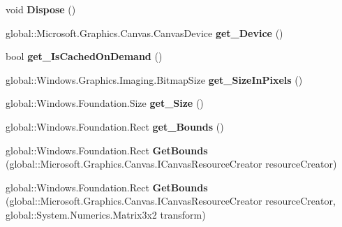 \begin{DoxyCompactItemize}
void {\bfseries Dispose} ()
\item 
\mbox{\label{class_microsoft_1_1_graphics_1_1_canvas_1_1_canvas_virtual_bitmap_add2a220c3a0d0912f49273fd03bc60ef}} 
global\+::\+Microsoft.\+Graphics.\+Canvas.\+Canvas\+Device {\bfseries get\+\_\+\+Device} ()
\item 
\mbox{\label{class_microsoft_1_1_graphics_1_1_canvas_1_1_canvas_virtual_bitmap_a37a9831f455bc5cc3a218d38d784c58a}} 
bool {\bfseries get\+\_\+\+Is\+Cached\+On\+Demand} ()
\item 
\mbox{\label{class_microsoft_1_1_graphics_1_1_canvas_1_1_canvas_virtual_bitmap_a439d7c35ef18134d0591a7224da39d45}} 
global\+::\+Windows.\+Graphics.\+Imaging.\+Bitmap\+Size {\bfseries get\+\_\+\+Size\+In\+Pixels} ()
\item 
\mbox{\label{class_microsoft_1_1_graphics_1_1_canvas_1_1_canvas_virtual_bitmap_a3666de30987670dccd0b71e58afa0622}} 
global\+::\+Windows.\+Foundation.\+Size {\bfseries get\+\_\+\+Size} ()
\item 
\mbox{\label{class_microsoft_1_1_graphics_1_1_canvas_1_1_canvas_virtual_bitmap_a6664a6235d655fc26b219ad204fef7ae}} 
global\+::\+Windows.\+Foundation.\+Rect {\bfseries get\+\_\+\+Bounds} ()
\item 
\mbox{\label{class_microsoft_1_1_graphics_1_1_canvas_1_1_canvas_virtual_bitmap_a23dbbaf8b46875ac886417621e2ffd2e}} 
global\+::\+Windows.\+Foundation.\+Rect {\bfseries Get\+Bounds} (global\+::\+Microsoft.\+Graphics.\+Canvas.\+I\+Canvas\+Resource\+Creator resource\+Creator)
\item 
\mbox{\label{class_microsoft_1_1_graphics_1_1_canvas_1_1_canvas_virtual_bitmap_aaa158707cfd84b8d995986896e041c86}} 
global\+::\+Windows.\+Foundation.\+Rect {\bfseries Get\+Bounds} (global\+::\+Microsoft.\+Graphics.\+Canvas.\+I\+Canvas\+Resource\+Creator resource\+Creator, global\+::\+System.\+Numerics.\+Matrix3x2 transform)

\end{DoxyCompactItemize}
